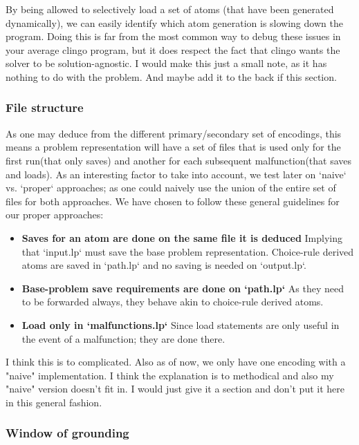 \documentclass{llncs}
\begin{document}
By being allowed to selectively load a set of atoms (that have been generated dynamically), we can easily identify which atom generation is slowing down the program. Doing this is far from the most common way to debug these issues in your average clingo program, but it does respect the fact that clingo wants the solver to be solution-agnostic. 
\color{black} \color{gray} I would make this just a small note, as it has nothing to do with the problem. And maybe add it to the back if this section. \color{black}
\subsubsection{File structure}
\color{green}
As one may deduce from the different primary/secondary set of encodings, this means a problem representation will have a set of files that is used only for the first run(that only saves) and another for each subsequent malfunction(that saves and loads). As an interesting factor to take into account, we test later on `naive` vs. `proper` approaches; as one could naively use the union of the entire set of files for both approaches. We have chosen to follow these general guidelines for our proper approaches:
\begin{itemize}
	\item  \textbf{Saves for an atom are done on the same file it is deduced} Implying that `input.lp` must save the base problem representation. Choice-rule derived atoms are saved in `path.lp` and no saving is needed on `output.lp`. 
	\item  \textbf{Base-problem save requirements are done on `path.lp`} As they need to be forwarded always, they behave akin to choice-rule derived atoms.  
	\item  \textbf{Load only in `malfunctions.lp`}  Since load statements are only useful in the event of a malfunction; they are done there. 
\end{itemize}
\color{black} \color{gray} I think this is to complicated. Also as of now, we only have one encoding with a "naive" implementation. I think the explanation is to methodical and also my "naive" version doesn't fit in. I would just give it a section and don't put it here in this general fashion. \color{black}
\subsubsection{Window of grounding}
\end{document}
